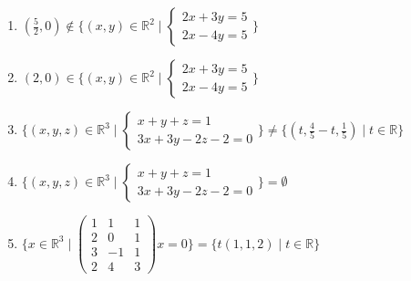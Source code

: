 \documentclass[11pt,a4paper]{article}
\begin{document}
\begin{enumerate}
\item $\displaystyle (\frac{5}{2}, 0) \notin \{(x, y) \in \mathbb{R}^{2} \mid \begin{cases} 2x + 3y = 5 \\ 2x - 4y = 5 \end{cases}\}$
\item $\displaystyle (2, 0) \in \{(x, y) \in \mathbb{R}^{2} \mid \begin{cases} 2x + 3y = 5 \\ 2x - 4y = 5 \end{cases}\}$
\item $\displaystyle \{(x, y, z) \in \mathbb{R}^{3} \mid \begin{cases} x + y + z = 1 \\ 3x + 3y - 2z - 2 = 0 \end{cases}\} \neq \{(t, \frac{4}{5} - t, \frac{1}{5}) \mid t \in \mathbb{R}\}$
\item $\displaystyle \{(x, y, z) \in \mathbb{R}^{3} \mid \begin{cases} x + y + z = 1 \\ 3x + 3y - 2z - 2 = 0 \end{cases}\} = \emptyset$
\item $\displaystyle \{x \in \mathbb{R}^{3} \mid \begin{pmatrix} 1 & 1 & 1 \\ 2 & 0 & 1 \\ 3 & -1 & 1 \\ 2 & 4 & 3 \end{pmatrix} x = 0\} = \{t (1, 1, 2) \mid t \in \mathbb{R}\}$
\end{enumerate}
\end{document}
